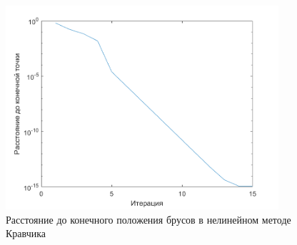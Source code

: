 \begin{figure}[H]
\includegraphics[width=0.9\textwidth]{Graphics/NonLinear_dist_to_end.png}
\caption{Расстояние до конечного положения брусов в нелинейном методе Кравчика} 
\end{figure}
